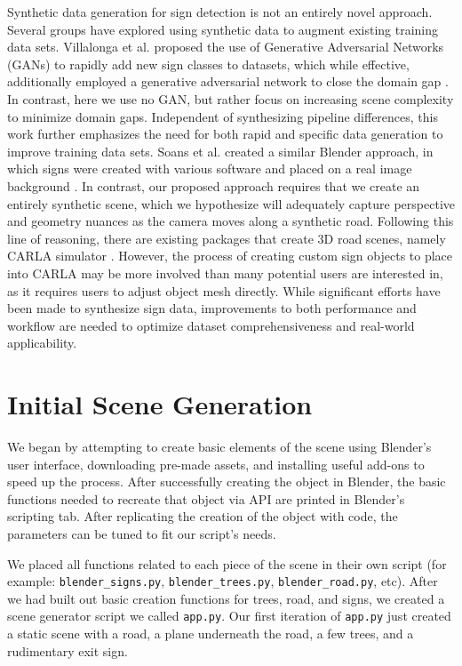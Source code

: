 \documentclass[journal]{IEEEtran}
\begin{document}
 Synthetic data generation for sign detection is not an entirely novel approach. Several groups have explored using synthetic data to augment existing training data sets. Villalonga et al. proposed the use of Generative Adversarial Networks (GANs) to rapidly add new sign classes to datasets, which while effective, additionally employed a generative adversarial network to close the domain gap \cite{GAN_artificial_data}. In contrast, here we use no GAN, but rather focus on increasing scene complexity to minimize domain gaps. Independent of synthesizing pipeline differences, this work further emphasizes the need for both rapid and specific data generation to improve training data sets. Soans et al. created a similar Blender approach, in which signs were created with various software and placed on a real image background \cite{blender_paper}. In contrast, our proposed approach requires that we create an entirely synthetic scene, which we hypothesize will adequately capture perspective and geometry nuances as the camera moves along a synthetic road. Following this line of reasoning, there are existing packages that create 3D road scenes, namely CARLA simulator \cite{Dosovitskiy17}. However, the process of creating custom sign objects to place into CARLA may be more involved than many potential users are interested in, as it requires users to adjust object mesh directly. While significant efforts have been made to synthesize sign data, improvements to both performance and workflow are needed to optimize dataset comprehensiveness and real-world applicability. 

 \section{Initial Scene Generation}
 We began by attempting to create basic elements of the scene using Blender's user interface, downloading pre-made assets, and installing useful add-ons to speed up the process. After successfully creating the object in Blender, the basic functions needed to recreate that object via API are printed in Blender's scripting tab. After replicating the creation of the object with code, the parameters can be tuned to fit our script's needs.
 
 We placed all functions related to each piece of the scene in their own script (for example: \texttt{blender\_signs.py}, \texttt{blender\_trees.py}, \texttt{blender\_road.py}, etc). After we had built out basic creation functions for trees, road, and signs, we created a scene generator script we called \texttt{app.py}. Our first iteration of \texttt{app.py} just created a static scene with a road, a plane underneath the road, a few trees, and a rudimentary exit sign.
 
\end{document}

